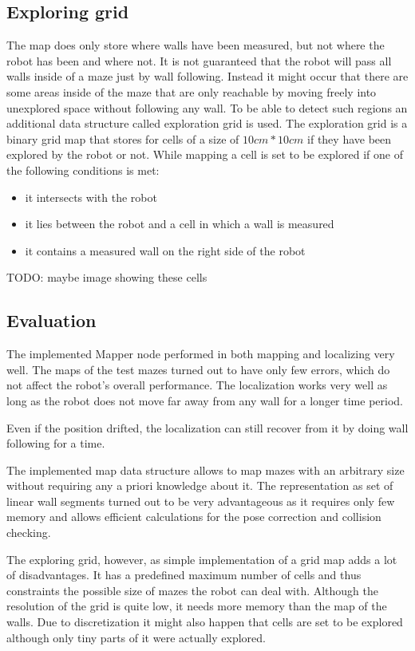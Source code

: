\subsection{Exploring grid}
The map does only store where walls have been measured, but not where the robot 
has been and where not. It is not guaranteed that the robot will pass all walls inside
of a maze just by wall following. Instead it might occur that there are some areas inside of the
maze that are only reachable by moving freely into unexplored space without following any wall.
To be able to detect such regions an additional data structure called exploration grid is used.
The exploration grid is a binary grid map that stores for cells of a size of
$10cm*10cm$ if they have been explored by the robot or not.
While mapping a cell is set to be explored if one of the following conditions is met:

\begin{itemize}
\item it intersects with the robot
\item it lies between the robot and a cell in which a wall is measured
\item it contains a measured wall on the right side of the robot
\end{itemize}

TODO: maybe image showing these cells



\subsection{Evaluation}

The implemented Mapper node performed in both mapping and localizing very well. The maps of the test mazes turned out to have only few errors, which do not affect the robot’s overall performance. The localization works very well as long as the robot does not move far away from any wall for a longer time period. 

Even if the position drifted, the localization can still recover from it by doing wall following for a time.

The implemented map data structure allows to map mazes with an arbitrary size without requiring any a priori knowledge about it. The representation as set of linear wall segments turned out to be very advantageous as it requires only few memory and allows efficient calculations for the pose correction and collision checking. 

The exploring grid, however, as simple implementation of a grid map adds a lot of disadvantages. It has a predefined maximum number of cells and thus constraints the possible size of mazes the robot can deal with. Although the resolution of the grid is quite low, it needs more memory than the map of the walls. Due to discretization it might also happen that cells are set to be explored although only tiny parts of it were actually explored.

